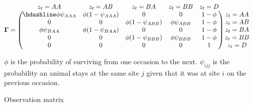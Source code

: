\documentclass[
  12pt,
]{krantz}
\begin{document}
\[
\begin{matrix}
& \\
\mathbf{\Gamma} =
\left ( \vphantom{ \begin{matrix} 12 \\ 12 \\ 12 \\ 12 \\ 12\end{matrix} } \right .
\end{matrix}
\hspace{-1.2em}
\begin{matrix}
z_t=AA & z_t=AB & z_t=BA & z_t=BB & z_t=D \\ \hdashline
\phi \psi_{AAA} & \phi (1 - \psi_{AAA}) & 0 & 0 & 1 - \phi\\
0 & 0 & \phi (1 - \psi_{ABB}) & \phi \psi_{ABB} & 1 - \phi\\
\phi \psi_{BAA} & \phi (1 - \psi_{BAA}) & 0 & 0 & 1 - \phi\\
0 & 0 & \phi (1-\psi_{BBB}) & \phi \psi_{BBB} & 1 - \phi\\
0 & 0 & 0 & 0 & 1
\end{matrix}
\hspace{-0.2em}
\begin{matrix}
& \\
\left . \vphantom{ \begin{matrix} 12 \\ 12 \\ 12 \\ 12 \\ 12\end{matrix} } \right )
\begin{matrix}
z_t=AA \\ z_t=AB \\ z_t=BA \\ z_t=BB \\ z_t=D
\end{matrix}
\end{matrix}
\]

\(\phi\) is the probability of surviving from one occasion to the next. \(\psi_{ijj}\) is the probability an animal stays at the same site \(j\) given that it was at site \(i\) on the previous occasion.

Observation matrix
\end{document}
